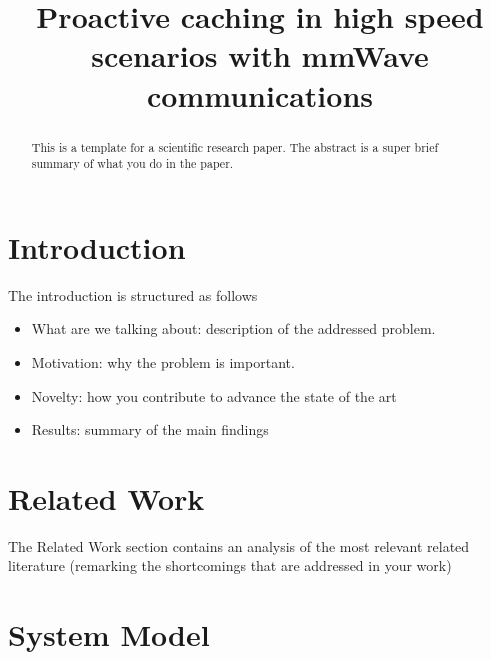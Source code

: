 \documentclass[conference,10pt]{IEEEtran}
\begin{document}
\title{Proactive	caching	in	high	speed	scenarios	with	mmWave	communications}

\author{
}

\maketitle

\begin{abstract}
This is a template for a scientific research paper. The abstract is a super brief summary of what you do in the paper.
\end{abstract}

\section{Introduction}\label{sec:intro}
The introduction is structured as follows
\begin{itemize}
	\item What are we talking about: description of the addressed problem. 
\item Motivation: why the problem is important.
\item Novelty: how you contribute to advance the state of the art
\item Results: summary of the main findings 
\end{itemize}

\section{Related Work}\label{sec:sota}
The Related Work section contains an analysis of the most relevant related literature (remarking the shortcomings that are addressed in your work)

\section{System Model}\label{sec:symo}
\end{document}
